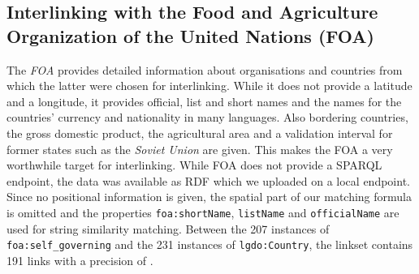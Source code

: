 \begin{table}[ht]
\begin{threeparttable}
\begin{tablenotes}
\end{tablenotes}
\end{threeparttable}
\end{table}

\subsection{Interlinking with the Food and Agriculture Organization of the United Nations (FOA)}
The \emph{FOA} provides detailed information about organisations and countries from which the latter were chosen for interlinking.
While it does not provide a latitude and a longitude, it provides official, list and short names and the names for the countries' currency
and nationality in many languages. Also bordering countries, the gross domestic product, the agricultural area and a validation interval for former states such as
the \emph{Soviet Union} are given. This makes the FOA a very worthwhile target for interlinking.
While FOA does not provide a SPARQL endpoint, the data was available as RDF which we uploaded on a local endpoint.
Since no positional information is given, the spatial part of our matching formula is omitted and the properties \nolinkurl{foa:shortName}, \nolinkurl{listName} and \nolinkurl{officialName} are used for string similarity matching.
Between the 207 instances of \nolinkurl{foa:self_governing} and the 231 instances of \nolinkurl{lgdo:Country},
the linkset contains 191 links with a precision of . 

